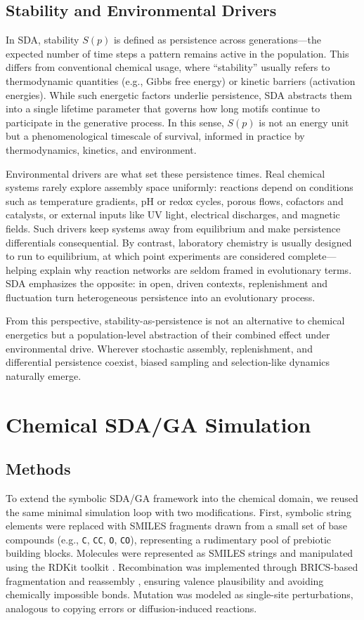 \documentclass[life,article,submit,pdftex,moreauthors]{Definitions/mdpi}
\begin{document}
\subsection{Stability and Environmental Drivers}

In SDA, stability $S(p)$ is defined as persistence across generations—the expected number of time steps a pattern remains active in the population. This differs from conventional chemical usage, where “stability” usually refers to thermodynamic quantities (e.g., Gibbs free energy) or kinetic barriers (activation energies). While such energetic factors underlie persistence, SDA abstracts them into a single lifetime parameter that governs how long motifs continue to participate in the generative process. In this sense, $S(p)$ is not an energy unit but a phenomenological timescale of survival, informed in practice by thermodynamics, kinetics, and environment.

Environmental drivers are what set these persistence times. Real chemical systems rarely explore assembly space uniformly: reactions depend on conditions such as temperature gradients, pH or redox cycles, porous flows, cofactors and catalysts, or external inputs like UV light, electrical discharges, and magnetic fields. Such drivers keep systems away from equilibrium and make persistence differentials consequential. By contrast, laboratory chemistry is usually designed to run to equilibrium, at which point experiments are considered complete—helping explain why reaction networks are seldom framed in evolutionary terms. SDA emphasizes the opposite: in open, driven contexts, replenishment and fluctuation turn heterogeneous persistence into an evolutionary process.  

From this perspective, stability-as-persistence is not an alternative to chemical energetics but a population-level abstraction of their combined effect under environmental drive. Wherever stochastic assembly, replenishment, and differential persistence coexist, biased sampling and selection-like dynamics naturally emerge.



\section{Chemical SDA/GA Simulation}

\subsection{Methods}
To extend the symbolic SDA/GA framework into the chemical domain, we reused the same minimal simulation loop with two modifications. First, symbolic string elements were replaced with SMILES fragments drawn from a small set of base compounds (e.g., \texttt{C}, \texttt{CC}, \texttt{O}, \texttt{CO}), representing a rudimentary pool of prebiotic building blocks. Molecules were represented as SMILES strings and manipulated using the RDKit toolkit \cite{landrum2006rdkit}. Recombination was implemented through BRICS-based fragmentation and reassembly \cite{degen2008art}, ensuring valence plausibility and avoiding chemically impossible bonds. Mutation was modeled as single-site perturbations, analogous to copying errors or diffusion-induced reactions.
\end{document}
